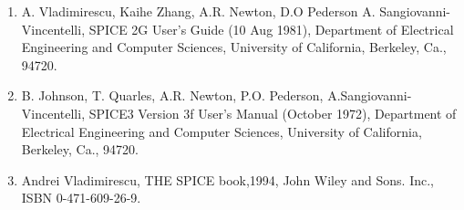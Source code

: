 \begin{enumerate}
 \item A. Vladimirescu, Kaihe Zhang, A.R. Newton, D.O Pederson A. Sangiovanni-Vincentelli, SPICE 2G User's Guide (10 Aug 1981), Department of Electrical Engineering and Computer Sciences, University of California, Berkeley, Ca., 94720.
\item B. Johnson, T. Quarles, A.R. Newton, P.O. Pederson, A.Sangiovanni-Vincentelli, SPICE3 Version 3f User's Manual (October 1972),  Department of Electrical Engineering and Computer Sciences, University of California, Berkeley, Ca., 94720.
\item Andrei Vladimirescu, THE SPICE book,1994, John Wiley and Sons. Inc., ISBN 0-471-609-26-9.
\end{enumerate}


